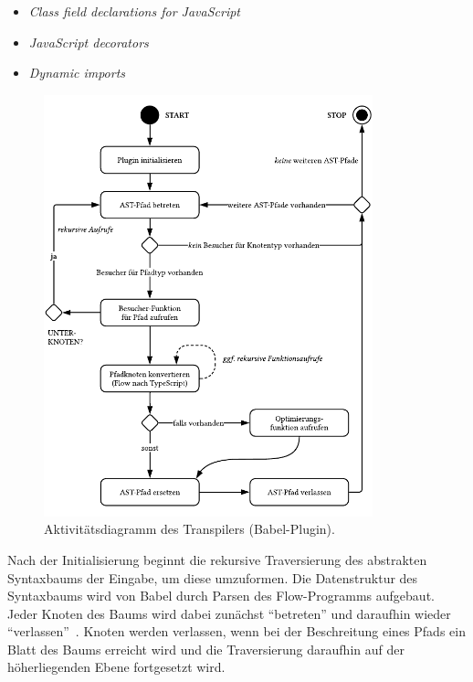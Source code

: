 {\begin{itemize}
  \item \textit{Class field declarations for JavaScript}~\autocite{ES_PROPOSAL:CLASS_FIELDS}
  \item \textit{JavaScript decorators}~\autocite{ES_PROPOSAL:DECORATORS}
  \item \textit{Dynamic imports}~\autocite{ES_PROPOSAL:DYNAMIC_IMPORTS}
\end{itemize}

\begin{figure}[p]
  \centering
  \includegraphics[width=0.85\textwidth]{src/4_Umsetzung/fig/activity-diagram-plugin.pdf}
  \caption{Aktivitätsdiagramm des Transpilers (Babel-Plugin).}
  \label{fig:activity-diagram-plugin}
\end{figure}

Nach der Initialisierung beginnt die rekursive Traversierung des abstrakten Syntaxbaums der Eingabe, um diese umzuformen. Die Datenstruktur des Syntaxbaums wird von Babel durch Parsen des Flow-Programms aufgebaut. Jeder Knoten des Baums wird dabei zunächst \enquote{betreten} und daraufhin wieder \enquote{verlassen}~\autocite{BABEL:HANDBOOK}. Knoten werden verlassen, wenn bei der Beschreitung eines Pfads ein Blatt des Baums erreicht wird und die Traversierung daraufhin auf der höherliegenden Ebene fortgesetzt wird.

}
